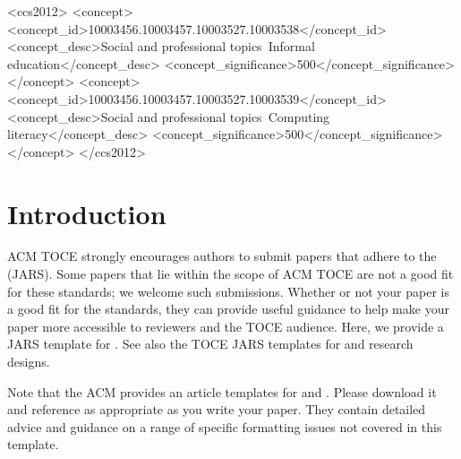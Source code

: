 \documentclass[acmsmall]{acmart}
\begin{document}
\begin{CCSXML}
<ccs2012>
<concept>
<concept_id>10003456.10003457.10003527.10003538</concept_id>
<concept_desc>Social and professional topics~Informal education</concept_desc>
<concept_significance>500</concept_significance>
</concept>
<concept>
<concept_id>10003456.10003457.10003527.10003539</concept_id>
<concept_desc>Social and professional topics~Computing literacy</concept_desc>
<concept_significance>500</concept_significance>
</concept>
</ccs2012>
\end{CCSXML}



\maketitle

\section{Introduction}
ACM TOCE strongly encourages authors to submit papers that adhere to the \hyperlink{https://apastyle.apa.org/jars/}{\color{blue}{American Psychological Association’s Journal Article Reporting Standards}}  (JARS).  Some papers that lie within the scope of ACM TOCE are not a good fit for these standards; we welcome such submissions. Whether or not your paper is a good fit for the standards, they can provide useful guidance to help make your paper more accessible to reviewers and the TOCE audience.
Here, we provide a JARS template for \hyperlink{https://apastyle.apa.org/jars/mixed-table-1.pdf}{\color{blue}{mixed-method research designs}}.  See also the TOCE JARS templates for \hyperlink{https://apastyle.apa.org/jars/quantitative}{\color{blue}{quantitative}} and \hyperlink{https://apastyle.apa.org/jars/qualitative}{\color{blue}{qualitative}} research designs.

Note that the ACM provides an article templates for \hyperlink{https://www.acm.org/binaries/content/assets/publications/taps/acm_submission_template.docx}{\color{blue}{Microsoft Word}} and \hyperlink{https://www.acm.org/binaries/content/assets/publications/consolidated-tex-template/acmart-master.zip}{\color{blue}{Latex}}. Please download it and reference as appropriate as you write your paper. They contain detailed advice and guidance on a range of specific formatting issues not covered in this template.
\end{document}
